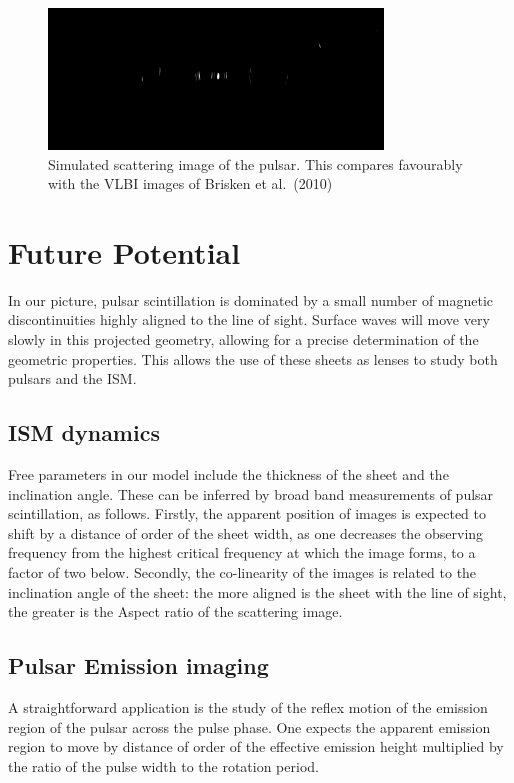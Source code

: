 \documentclass[useAMS,usenatbib]{mn2e}
\begin{document}
\begin{figure}
\centerline{\includegraphics[width=3.5in]{image86.png}}
\caption{Simulated scattering image of the pulsar.  This
  compares favourably with the VLBI images of Brisken et al.~(2010)
}
\label{fig:2d}
\end{figure}

\section{Future Potential}

In our picture, pulsar scintillation is dominated by a small number of
magnetic discontinuities highly aligned to the line of sight.  Surface
waves will move very slowly in this projected geometry, allowing for a
precise determination of the geometric properties.  This allows the
use of these sheets as lenses to study both pulsars and the ISM.  

\subsection{ISM dynamics}

Free parameters in our model include the thickness of the sheet and the
inclination angle.  These can be inferred by broad band measurements
of pulsar scintillation, as follows. Firstly, the apparent position of images is expected to shift by
a distance of order of the sheet width, as one decreases the observing frequency from the
highest critical frequency at which the image forms, to a factor of
two below.  Secondly, the co-linearity of the images is related to
the inclination angle of the sheet: the more aligned is the sheet with the line of
sight, the greater is the Aspect ratio of the scattering image.

\subsection{Pulsar Emission imaging}

A straightforward application is the study of the reflex motion of the
emission region of the pulsar across the pulse phase.  One expects the
apparent emission region to move by distance of order of the effective emission height
multiplied by the ratio of the pulse width to the rotation period.
\end{document}
